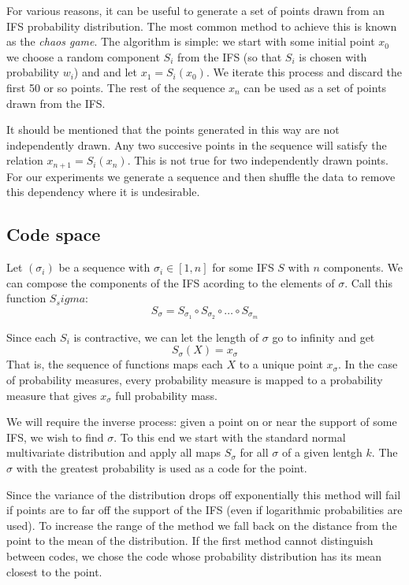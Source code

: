 \documentclass[11pt]{article}
\theoremstyle{definition}
\begin{document}
For various reasons, it can be useful to generate a set of points drawn from an IFS probability distribution. The most common method to achieve this is known as the \emph{chaos game}. The algorithm is simple: we start with some initial point $x_0$ we choose a random component $S_i$ from the IFS (so that $S_i$ is chosen with probability $w_i$) and and let $x_1 = S_i(x_0)$. We iterate this process and discard the first 50 or so points. The rest of the sequence $x_n$ can be used as a set of points drawn from the IFS.

It should be mentioned that the points generated in this way are not independently drawn. Any two succesive points in the sequence will satisfy the relation $x_{n+1} = S_i(x_{n})$. This is not true for two independently drawn points. For our experiments we generate a sequence and then shuffle the data to remove this dependency where it is undesirable.

\subsection{Code space}

Let $(\sigma_i)$ be a sequence with $\sigma_i \in [1, n]$ for some IFS $S$ with $n$ components. We can compose the components of the IFS acording to the elements of $\sigma$. Call this function $S_sigma$:
\[
S_\sigma = S_{\sigma_1} \circ S_{\sigma_2} \circ \ldots \circ S_{\sigma_m}
\]

Since each $S_i$ is contractive, we can let the length of $\sigma$ go to infinity and get 
\[
S_\sigma(X) = x_\sigma  
\] 
That is, the sequence of functions maps each $X$ to a unique point $x_\sigma$. In the case of probability measures, every probability measure is mapped to a probability measure that gives $x_\sigma$ full probability mass.

We will require the inverse process: given a point on or near the support of some IFS, we wish to find $\sigma$. To this end we start with the standard normal multivariate distribution and apply all maps $S_\sigma$ for all $\sigma$ of a given lentgh $k$. The $\sigma$ with the greatest probability is used as a code for the point.

Since the variance of the distribution drops off exponentially this method will fail if points are to far off the support of the IFS (even if logarithmic probabilities are used). To increase the range of the method we fall back on the distance from the point to the mean of the distribution. If the first method cannot distinguish between codes, we chose the code whose probability distribution has its mean closest to the point.
\end{document}
